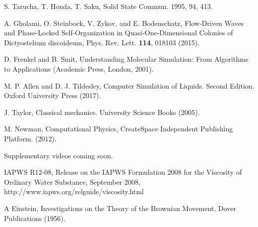 \documentclass[twocolumn,preprintnumbers,amsmath,amssymb,aps,prx]{revtex4}
\begin{document}
\begin{thebibliography}{99}
      S. Tarucha, T. Honda,  T. Saku, Solid State Commun. 1995, 94, 413.

     A. Gholami, O. Steinbock, V. Zykov, and E. Bodenschatz, Flow-Driven Waves and Phase-Locked Self-Organization in Quasi-One-Dimensional Colonies of Dictyostelium discoideum, Phys. Rev. Lett. {\bf 114}, 018103 (2015).


     D. Frenkel and B. Smit, Understanding Molecular Simulation: From Algorithms to Applications (Academic Press, London, 2001).
      
     M. P. Allen and D. J. Tildesley, Computer Simulation of Liquids.  Second Edition. Oxford University Press (2017).

     J. Taylor,  Classical mechanics. University Science Books (2005).

       M. Newman, Computational Physics, CreateSpace Independent Publishing Platform. (2012).
      
       Supplementary videos coming soon.

  IAPWS R12-08, 
  Release on the IAPWS Formulation 2008 for the Viscosity of Ordinary Water Substance, 
  September 2008, 
  http://www.iapws.org/relguide/viscosity.html

   A Einstein, Investigations on the Theory of the Brownian Movement,  Dover Publications (1956).
    






\end{thebibliography}
\end{document}
